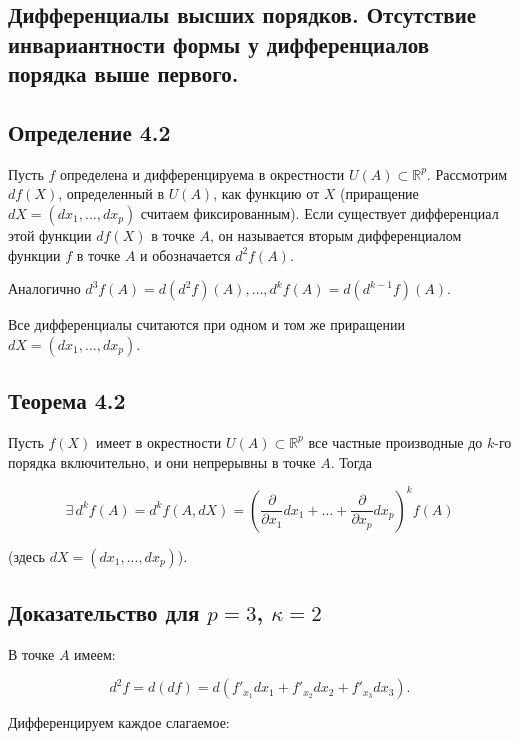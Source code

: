 {
\subsection{Дифференциалы высших порядков. Отсутствие инвариантности формы у дифференциалов порядка выше первого.}

\subsection*{Определение 4.2}

Пусть \( f \) определена и дифференцируема в окрестности \( U(A) \subset \mathbb{R}^p \). Рассмотрим \( df(X) \), определенный в \( U(A) \), как функцию от \( X \) (приращение \( dX = (dx_1, ..., dx_p) \) считаем фиксированным). Если существует дифференциал этой функции \( df(X) \) в точке \( A \), он называется вторым дифференциалом функции \( f \) в точке \( A \) и обозначается \( d^2f(A) \).

Аналогично \( d^3f(A) = d(d^2f)(A), \ldots, d^kf(A) = d(d^{k-1}f)(A) \).

Все дифференциалы считаются при одном и том же приращении \( dX = (dx_1, ..., dx_p) \).

\subsection*{Теорема 4.2}

Пусть \( f(X) \) имеет в окрестности \( U(A) \subset \mathbb{R}^p \) все частные производные до \( k \)-го порядка включительно, и они непрерывны в точке \( A \). Тогда



\[
\exists \, d^kf(A) = d^kf(A, dX) = \left( \frac{\partial}{\partial x_1} dx_1 + \ldots + \frac{\partial}{\partial x_p} dx_p \right)^k f(A)
\]



(здесь \( dX = (dx_1, ..., dx_p) \)).


\subsection*{Доказательство для \( p = 3 \), \( \kappa = 2 \)}

В точке \( A \) имеем:



\[
d^2 f = d (df) = d \left( f'_{x_1} dx_1 + f'_{x_2} dx_2 + f'_{x_3} dx_3 \right).
\]



Дифференцируем каждое слагаемое:



}
